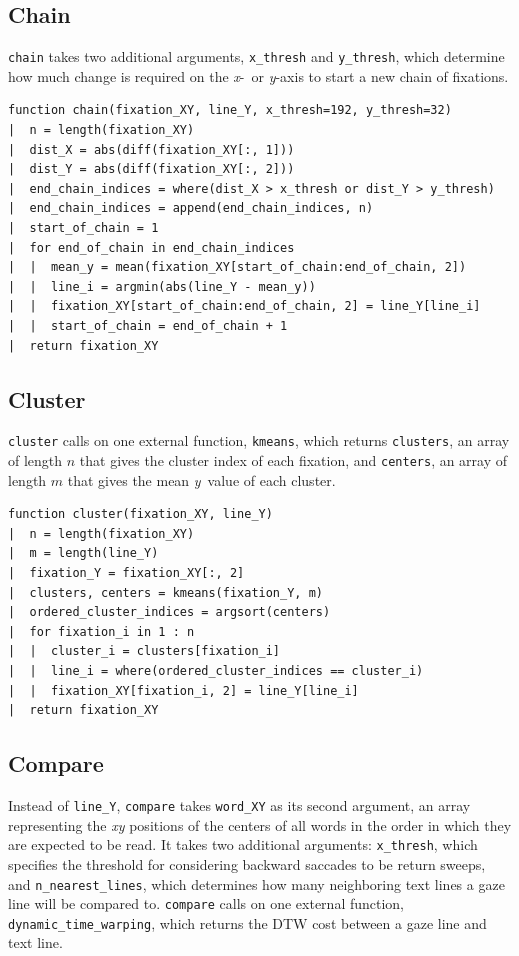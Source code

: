 \documentclass[doc,biblatex]{apa7}
\begin{document}
\subsection{Chain}

\texttt{chain} takes two additional arguments, \texttt{x\_thresh} and \texttt{y\_thresh}, which determine how much change is required on the \textit{x}-~or \textit{y}-axis to start a new chain of fixations.

\begin{verbatim}
function chain(fixation_XY, line_Y, x_thresh=192, y_thresh=32)
|  n = length(fixation_XY)
|  dist_X = abs(diff(fixation_XY[:, 1]))
|  dist_Y = abs(diff(fixation_XY[:, 2]))
|  end_chain_indices = where(dist_X > x_thresh or dist_Y > y_thresh)
|  end_chain_indices = append(end_chain_indices, n)
|  start_of_chain = 1
|  for end_of_chain in end_chain_indices
|  |  mean_y = mean(fixation_XY[start_of_chain:end_of_chain, 2])
|  |  line_i = argmin(abs(line_Y - mean_y))
|  |  fixation_XY[start_of_chain:end_of_chain, 2] = line_Y[line_i]
|  |  start_of_chain = end_of_chain + 1
|  return fixation_XY
\end{verbatim}

\subsection{Cluster}

\texttt{cluster} calls on one external function, \texttt{kmeans}, which returns \texttt{clusters}, an array of length $n$ that gives the cluster index of each fixation, and \texttt{centers}, an array of length $m$ that gives the mean \textit{y}~value of each cluster.

\begin{verbatim}
function cluster(fixation_XY, line_Y)
|  n = length(fixation_XY)
|  m = length(line_Y)
|  fixation_Y = fixation_XY[:, 2]
|  clusters, centers = kmeans(fixation_Y, m)
|  ordered_cluster_indices = argsort(centers)
|  for fixation_i in 1 : n
|  |  cluster_i = clusters[fixation_i]
|  |  line_i = where(ordered_cluster_indices == cluster_i)
|  |  fixation_XY[fixation_i, 2] = line_Y[line_i]
|  return fixation_XY
\end{verbatim}

\subsection{Compare}

Instead of \texttt{line\_Y}, \texttt{compare} takes \texttt{word\_XY} as its second argument, an array representing the \textit{xy} positions of the centers of all words in the order in which they are expected to be read. It takes two additional arguments: \texttt{x\_thresh}, which specifies the threshold for considering backward saccades to be return sweeps, and \texttt{n\_nearest\_lines}, which determines how many neighboring text lines a gaze line will be compared to. \texttt{compare} calls on one external function, \texttt{dynamic\_time\_warping}, which returns the DTW cost between a gaze line and text line.
\end{document}
